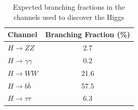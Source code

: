 \documentclass[oneside, letterpaper, oldfontcommands]{memoir}
\begin{document}
%    

\begin{table}[htbp]
  \centering
  \begin{tabular}{ | l | c |}
    \hline
    Channel & Branching Fraction (\%) \\ \hline \hline
     $H \rightarrow ZZ$ & 2.7 \\ \hline
     $H \rightarrow \gamma\gamma$ & 0.2 \\ \hline
    $H \rightarrow WW$ & 21.6 \\ \hline
    $H \rightarrow b\bar{b}$ & 57.5 \\ \hline
    $H \rightarrow \tau\tau$ & 6.3\\ \hline
    
  \end{tabular}
  \caption{Expected branching fractions in the channels used to discover the Higgs\cite{Khachatryan:2016vau}}
  \label{tab:higgsbr}
\end{table}
\end{document}
